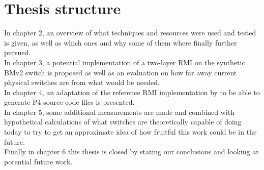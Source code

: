 \section{Thesis structure}
In chapter 2, an overview of what techniques and resources were used and tested is given, as well as which ones and why some of them where finally further pursued.\\

\noindent
In chapter 3, a potential implementation of a two-layer RMI on the synthetic BMv2 switch is proposed as well as an evaluation on how far away current physical switches are from what would be needed.\\

\noindent
In chapter 4, an adaptation of the reference RMI implementation by \cite{cdfshop} to be able to generate P4 source code files is presented.\\

\noindent
In chapter 5, some additional measurements are made and combined with hypothetical calculations of what switches are theoretically capable of doing today to try to get an approximate idea of how fruitful this work could be in the future.\\

\noindent
Finally in chapter 6 this thesis is closed by stating our conclusions and looking at potential future work.



